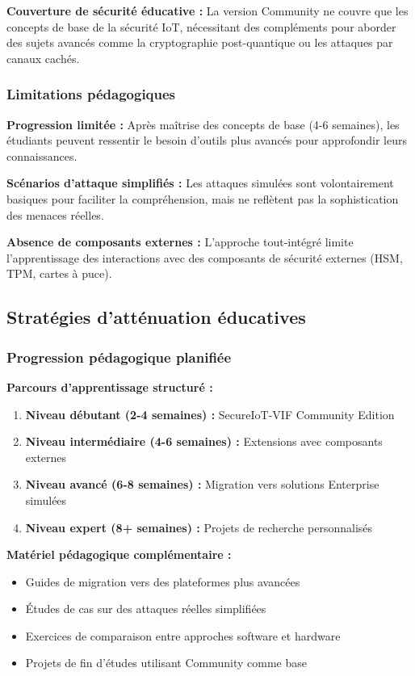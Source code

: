 \textbf{Couverture de sécurité éducative :} La version Community ne couvre que les concepts de base de la sécurité IoT, nécessitant des compléments pour aborder des sujets avancés comme la cryptographie post-quantique ou les attaques par canaux cachés.

\subsubsection{Limitations pédagogiques}

\textbf{Progression limitée :} Après maîtrise des concepts de base (4-6 semaines), les étudiants peuvent ressentir le besoin d'outils plus avancés pour approfondir leurs connaissances.

\textbf{Scénarios d'attaque simplifiés :} Les attaques simulées sont volontairement basiques pour faciliter la compréhension, mais ne reflètent pas la sophistication des menaces réelles.

\textbf{Absence de composants externes :} L'approche tout-intégré limite l'apprentissage des interactions avec des composants de sécurité externes (HSM, TPM, cartes à puce).

\subsection{Stratégies d'atténuation éducatives}

\subsubsection{Progression pédagogique planifiée}

\textbf{Parcours d'apprentissage structuré :}
\begin{enumerate}
    \item \textbf{Niveau débutant (2-4 semaines) :} SecureIoT-VIF Community Edition
    \item \textbf{Niveau intermédiaire (4-6 semaines) :} Extensions avec composants externes
    \item \textbf{Niveau avancé (6-8 semaines) :} Migration vers solutions Enterprise simulées
    \item \textbf{Niveau expert (8+ semaines) :} Projets de recherche personnalisés
\end{enumerate}

\textbf{Matériel pédagogique complémentaire :}
\begin{itemize}
    \item Guides de migration vers des plateformes plus avancées
    \item Études de cas sur des attaques réelles simplifiées
    \item Exercices de comparaison entre approches software et hardware
    \item Projets de fin d'études utilisant Community comme base
\end{itemize}


